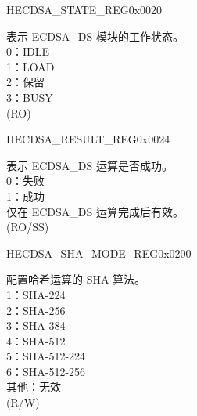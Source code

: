 \begin{register}{H}{ECDSA\_STATE\_REG}{0x0020}\label{regdesc:ECDSASTATEREG}
%
%
\regnewline%
\begin{regdesc}\begin{reglist}
\label{fielddesc:ECDSABUSY}\item [ECDSA\_BUSY] 表示 ECDSA\_DS 模块的工作状态。\\
0：IDLE\\
1：LOAD\\
2：保留\\
3：BUSY\\
(RO)
\end{reglist}\end{regdesc}
\end{register}


\begin{register}{H}{ECDSA\_RESULT\_REG}{0x0024}\label{regdesc:ECDSARESULTREG}
%
%
\regnewline%
\begin{regdesc}\begin{reglist}
\label{fielddesc:ECDSAOPERATIONRESULT}\item [ECDSA\_OPERATION\_RESULT] 表示 ECDSA\_DS 运算是否成功。\\
0：失败\\
1：成功\\
仅在 ECDSA\_DS 运算完成后有效。\\
(RO/SS)
\end{reglist}\end{regdesc}
\end{register}


\begin{register}{H}{ECDSA\_SHA\_MODE\_REG}{0x0200}\label{regdesc:ECDSASHAMODEREG}
%
%
\regnewline%
\begin{regdesc}\begin{reglist}
\label{fielddesc:ECDSASHAMODE}\item [ECDSA\_SHA\_MODE] 配置哈希运算的 SHA 算法。\\
1：SHA-224\\
2：SHA-256\\
3：SHA-384\\
4：SHA-512\\
5：SHA-512-224\\
6：SHA-512-256\\
其他：无效\\
(R/W)
\end{reglist}\end{regdesc}
\end{register}


